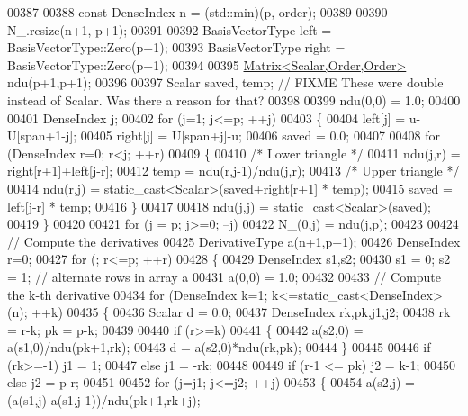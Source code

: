 \begin{DoxyCode}
00387 
00388     \textcolor{keyword}{const} DenseIndex n = (std::min)(p, order);
00389 
00390     N\_.resize(n+1, p+1);
00391 
00392     BasisVectorType left = BasisVectorType::Zero(p+1);
00393     BasisVectorType right = BasisVectorType::Zero(p+1);
00394 
00395     \hyperlink{group___core___module_class_eigen_1_1_matrix}{Matrix<Scalar,Order,Order>} ndu(p+1,p+1);
00396 
00397     Scalar saved, temp; \textcolor{comment}{// FIXME These were double instead of Scalar. Was there a reason for that?}
00398 
00399     ndu(0,0) = 1.0;
00400 
00401     DenseIndex j;
00402     \textcolor{keywordflow}{for} (j=1; j<=p; ++j)
00403     \{
00404       left[j] = u-U[span+1-j];
00405       right[j] = U[span+j]-u;
00406       saved = 0.0;
00407 
00408       \textcolor{keywordflow}{for} (DenseIndex r=0; r<j; ++r)
00409       \{
00410         \textcolor{comment}{/* Lower triangle */}
00411         ndu(j,r) = right[r+1]+left[j-r];
00412         temp = ndu(r,j-1)/ndu(j,r);
00413         \textcolor{comment}{/* Upper triangle */}
00414         ndu(r,j) = \textcolor{keyword}{static\_cast<}Scalar\textcolor{keyword}{>}(saved+right[r+1] * temp);
00415         saved = left[j-r] * temp;
00416       \}
00417 
00418       ndu(j,j) = \textcolor{keyword}{static\_cast<}Scalar\textcolor{keyword}{>}(saved);
00419     \}
00420 
00421     \textcolor{keywordflow}{for} (j = p; j>=0; --j) 
00422       N\_(0,j) = ndu(j,p);
00423 
00424     \textcolor{comment}{// Compute the derivatives}
00425     DerivativeType a(n+1,p+1);
00426     DenseIndex r=0;
00427     \textcolor{keywordflow}{for} (; r<=p; ++r)
00428     \{
00429       DenseIndex s1,s2;
00430       s1 = 0; s2 = 1; \textcolor{comment}{// alternate rows in array a}
00431       a(0,0) = 1.0;
00432 
00433       \textcolor{comment}{// Compute the k-th derivative}
00434       \textcolor{keywordflow}{for} (DenseIndex k=1; k<=static\_cast<DenseIndex>(n); ++k)
00435       \{
00436         Scalar d = 0.0;
00437         DenseIndex rk,pk,j1,j2;
00438         rk = r-k; pk = p-k;
00439 
00440         \textcolor{keywordflow}{if} (r>=k)
00441         \{
00442           a(s2,0) = a(s1,0)/ndu(pk+1,rk);
00443           d = a(s2,0)*ndu(rk,pk);
00444         \}
00445 
00446         \textcolor{keywordflow}{if} (rk>=-1) j1 = 1;
00447         \textcolor{keywordflow}{else}        j1 = -rk;
00448 
00449         \textcolor{keywordflow}{if} (r-1 <= pk) j2 = k-1;
00450         \textcolor{keywordflow}{else}           j2 = p-r;
00451 
00452         \textcolor{keywordflow}{for} (j=j1; j<=j2; ++j)
00453         \{
00454           a(s2,j) = (a(s1,j)-a(s1,j-1))/ndu(pk+1,rk+j);

\end{DoxyCode}
